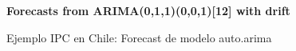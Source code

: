 \vspace{4mm}	
\begin{figure}[h]
	\centering
	\textbf{Forecasts from ARIMA(0,1,1)(0,0,1)[12] with drift}\par\medskip
	\caption{Ejemplo IPC en Chile: Forecast de modelo auto.arima}\label{fig27}
\end{figure}

